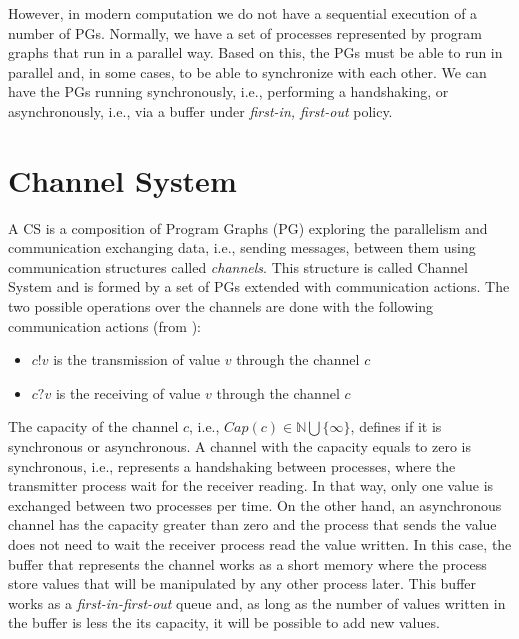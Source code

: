 However, in modern computation we do not have a sequential execution of a number of PGs. Normally, we have a set of processes represented by program graphs that run in a parallel way. Based on this, the PGs must be able to run in parallel and, in some cases, to be able to synchronize with each other. We can have the PGs running synchronously, i.e., performing a handshaking, or asynchronously, i.e., via a buffer under \textit{first-in, first-out} policy.



\section {Channel System}

A CS is a composition  of Program Graphs (PG) exploring the parallelism and communication exchanging data, i.e., sending messages, between them using communication structures called \textit{channels}\cite{baier}. This structure is called Channel System and is formed by a set of PGs extended with communication actions. The two possible operations over the channels are done with the following communication actions (from \cite{baier}):

\begin{itemize}
	\item $c!v$ is the transmission of value $v$ through the channel $c$ 
	\item $c?v$ is the receiving of value $v$ through the channel $c$
\end{itemize}

The capacity of the channel $c$, i.e., $Cap(c) \in \mathbb{N} \bigcup \{\infty\}$, defines if it is synchronous or asynchronous. A channel with the capacity equals to zero is synchronous, i.e., represents a handshaking between processes, where the transmitter process wait for the receiver reading. In that way, only one value is exchanged between two processes per time. On the other hand, an asynchronous channel has the capacity greater than zero and the process that sends the value does not need to wait the receiver process read the value written. In this case, the buffer that represents the channel works as a short memory where the process store values that will be manipulated by any other process later. This buffer works as a \textit{first-in-first-out} queue and, as long as the number of values written in the buffer is less the its capacity, it will be possible to add new values. 


